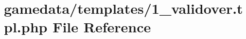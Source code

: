 \hypertarget{1__validover_8tpl_8php}{\section{gamedata/templates/1\+\_\+validover.tpl.\+php File Reference}
\label{1__validover_8tpl_8php}
}
